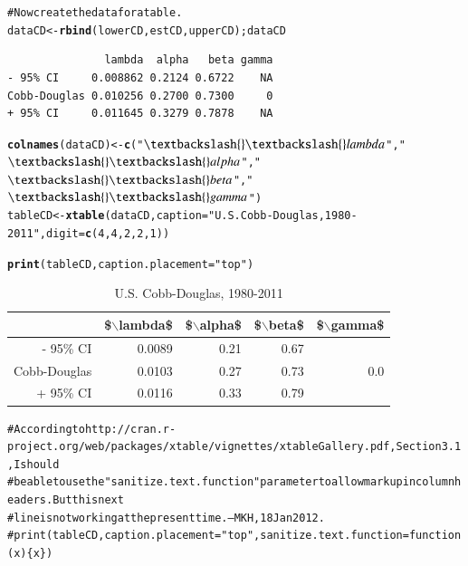 \documentclass[preprint,authoryear,12pt]{elsarticle}\usepackage{graphicx, color}
\makeatletter
\newcommand{\hlfunctioncall}[1]{\textcolor[rgb]{0.501960784313725,0,0.329411764705882}{\textbf{#1}}}%
\newcommand{\hlstring}[1]{\textcolor[rgb]{0.6,0.6,1}{#1}}%
\newcommand{\hlcomment}[1]{\textcolor[rgb]{0.180392156862745,0.6,0.341176470588235}{#1}}%
\newenvironment{kframe}{%
 \def\at@end@of@kframe{}%
 \ifinner\ifhmode%
  \def\at@end@of@kframe{\end{minipage}}%
  \begin{minipage}{\columnwidth}%
 \fi\fi%
 \def\FrameCommand##1{\hskip\@totalleftmargin \hskip-\fboxsep
 \colorbox{shadecolor}{##1}\hskip-\fboxsep
     \hskip-\linewidth \hskip-\@totalleftmargin \hskip\columnwidth}%
 \MakeFramed {\advance\hsize-\width
   \@totalleftmargin\z@ \linewidth\hsize
   \@setminipage}}%
 {\par\unskip\endMakeFramed%
 \at@end@of@kframe}
\newenvironment{knitrout}{}{} %
\makeatother
\begin{document}
\begin{knitrout}
\begin{kframe}
\begin{alltt}
\hlcomment{# Now create the data for a table.}
dataCD <- \hlfunctioncall{rbind}(lowerCD, estCD, upperCD); dataCD
\end{alltt}
\begin{verbatim}
               lambda  alpha   beta gamma
- 95% CI     0.008862 0.2124 0.6722    NA
Cobb-Douglas 0.010256 0.2700 0.7300     0
+ 95% CI     0.011645 0.3279 0.7878    NA
\end{verbatim}
\begin{alltt}
\hlfunctioncall{colnames}(dataCD) <- \hlfunctioncall{c}(\hlstring{"$\textbackslash{}\textbackslash{}lambda$"}, \hlstring{"$\textbackslash{}\textbackslash{}alpha$"}, \hlstring{"$\textbackslash{}\textbackslash{}beta$"}, \hlstring{"$\textbackslash{}\textbackslash{}gamma$"})
tableCD <- \hlfunctioncall{xtable}(dataCD, caption=\hlstring{"U.S. Cobb-Douglas, 1980-2011"}, digit = \hlfunctioncall{c}(4, 4, 2, 2, 1))
\end{alltt}
\end{kframe}
\end{knitrout}


\begin{kframe}
\begin{alltt}
\hlfunctioncall{print}(tableCD, caption.placement=\hlstring{"top"})
\end{alltt}
\end{kframe}%
\begin{table}[ht]
\begin{center}
\caption{U.S. Cobb-Douglas, 1980-2011}
\begin{tabular}{rrrrr}
  \hline
 & \$$\backslash$lambda\$ & \$$\backslash$alpha\$ & \$$\backslash$beta\$ & \$$\backslash$gamma\$ \\ 
  \hline
- 95\% CI & 0.0089 & 0.21 & 0.67 &  \\ 
  Cobb-Douglas & 0.0103 & 0.27 & 0.73 & 0.0 \\ 
  + 95\% CI & 0.0116 & 0.33 & 0.79 &  \\ 
   \hline
\end{tabular}
\end{center}
\end{table}
\begin{kframe}\begin{alltt}
\hlcomment{# According to http://cran.r-project.org/web/packages/xtable/vignettes/xtableGallery.pdf, Section 3.1, I should }
\hlcomment{# be able to use the "sanitize.text.function" parameter to allow markup in column headers. But this next}
\hlcomment{# line is not working at the present time. --MKH, 18 Jan 2012.}
\hlcomment{# print(tableCD, caption.placement="top", sanitize.text.function = function(x)\{x\})}
\end{alltt}
\end{kframe}
\end{document}
